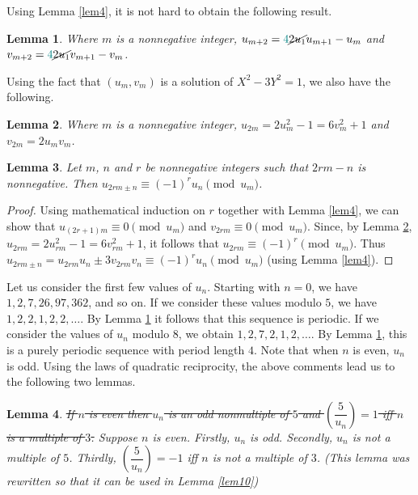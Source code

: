 \documentclass{article}
\newtheorem{lemma}{Lemma}
\numberwithin{lemma}{section}
\newcommand{\changed}[1]{{\color{teal} #1}}
\begin{document}
Using Lemma \ref{lem4}, it is not hard to obtain the following result.

\begin{lemma}\label{lem5}
Where $m$ is a nonnegative integer, $u_{m+2} = \changed{4}\cancel{2u_1} u_{m+1} - u_m$ and $v_{m+2} = \changed{4}\cancel{2u_1} v_{m+1} - v_m$.
\end{lemma}

Using the fact that $(u_m, v_m)$ is a solution of $X^2-3Y^2 = 1$, we also have the
following.

\begin{lemma}\label{lem6}
Where $m$ is a nonnegative integer, $u_{2m} = 2u_m^2-1 = 6v_m^2+1$ and
$v_{2m} = 2u_m v_m$.
\end{lemma}

\begin{lemma}\label{lem7}
Let $m$, $n$ and $r$ be nonnegative integers such that $2rm-n$ is nonnegative.
Then $u_{2rm \pm n} \equiv (-1)^r u_n \pmod{u_m}$.
\end{lemma}
\begin{proof}
Using mathematical induction on $r$ together with Lemma \ref{lem4}, we can show
that $u_{(2r+1)m} \equiv 0 \pmod{u_m}$ and $v_{2rm} \equiv 0 \pmod{u_m}$. Since, by Lemma \ref{lem6},
$u_{2rm} = 2u_{rm}^2-1 = 6v_{rm}^2+1$, it follows that $u_{2rm} \equiv (-1)^r \pmod{u_m}$. Thus
$u_{2rm \pm n} = u_{2rm} u_n \pm 3v_{2rm} v_n \equiv (-1)^r u_n \pmod{u_m}$ (using Lemma \ref{lem4}).
\end{proof}

Let us consider the first few values of $u_n$. Starting with $n = 0$, we have $1, 2, 7, 26, 97, 362$,
and so on. If we consider these values modulo $5$, we have $1, 2, 2, 1, 2, 2, \dots$.
By Lemma \ref{lem5} it follows that this sequence is periodic. If we consider the values of $u_n$
modulo $8$, we obtain $1, 2, 7, 2, 1, 2, \dots$. By Lemma \ref{lem5}, this is a purely periodic
sequence with period length $4$. Note that when $n$ is even, $u_n$ is odd. Using the laws
of quadratic reciprocity, the above comments lead us to the following two lemmas.

\begin{lemma}\label{lem8}
\sout{If $n$ is even then $u_n$ is an odd nonmultiple of $5$ and $\left(\dfrac{5}{u_n}\right) = 1$ iff $n$ is a multiple of $3$.} \changed{Suppose $n$ is even. Firstly, $u_n$ is odd. Secondly, $u_n$ is not a multiple of $5$. Thirdly, $\left(\dfrac{5}{u_n}\right) = -1$ iff $n$ is not a multiple of $3$. (This lemma was rewritten so that it can be used in Lemma \ref{lem10})}
\end{lemma}
\end{document}

